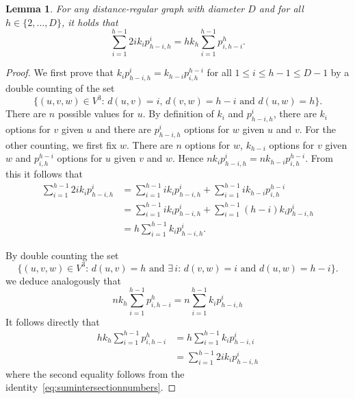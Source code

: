 \documentclass[a4paper,11pt]{article}
\newtheorem{lemma}[theorem]{Lemma}
\theoremstyle{definition}
\begin{document}
\begin{lemma}\label{lem:drgfactori}
    For any distance-regular graph with diameter $D$ and for all $h\in\{2,\dots,D\}$, it holds that $$\sum_{i = 1}^{h-1} 2ik_ip_{h-i,h}^i = hk_h\sum_{i = 1}^{h-1} p_{i,h-i}^h.$$
 
\end{lemma}

\begin{proof}
    We first prove that $k_ip_{h-i,h}^i = k_{h-i}p_{i,h}^{h-i}$ for all $1 \leq i \leq h-1 \leq D-1$ by a double counting of the set $$\{(u,v,w) \in V^3\colon\, d(u,v) = i,\, d(v,w) = h-i \text{ and } d(u,w) = h\}.$$ There are $n$ possible values for $u$. By definition of $k_i$ and $p_{h-i,h}^i$, there are $k_i$ options for $v$ given $u$ and there are $p_{h-i,h}^i$ options for $w$ given $u$ and $v$. For the other counting, we first fix $w$. There are $n$ options for $w$, $k_{h-i}$ options for $v$ given $w$ and $p_{i,h}^{h-i}$ options for $u$ given $v$ and $w$. Hence $nk_ip_{h-i,h}^i = nk_{h-i}p_{i,h}^{h-i}$. From this it follows that
    \begin{equation}\label{eq:sumintersectionnumbers}
    \begin{aligned}
        \sum_{i = 1}^{h-1} 2ik_ip_{h-i,h}^i &= \sum_{i = 1}^{h-1} ik_ip_{h-i,h}^i + \sum_{i = 1}^{h-1} ik_{h-i}p_{i,h}^{h-i}\\ 
        &= \sum_{i = 1}^{h-1} ik_ip_{h-i,h}^i + \sum_{i = 1}^{h-1} (h-i)k_ip_{h-i,h}^{i}\\
        &= h\sum_{i = 1}^{h-1} k_ip_{h-i,h}^i. 
    \end{aligned}            
    \end{equation}

    By double counting the set 
    $$\{(u,v,w) \in V^3\colon\, d(u,v) = h\text{ and } \exists\, i \colon\, d(v,w) = i\text{ and } d(u,w) = h-i\}.$$ we deduce analogously that 
    \begin{equation*}
        nk_h\sum_{i = 1}^{h-1} p_{i,h-i}^h = n\sum_{i = 1}^{h-1} k_ip_{h-i,h}^i
    \end{equation*}
    It follows directly that
    \begin{align*}
        hk_h\sum_{i = 1}^{h-1} p_{i,h-i}^h &= h\sum_{i = 1}^{h-1} k_ip_{h-i,i}^i\\
        &= \sum_{i = 1}^{h-1} 2ik_ip_{h-i,h}^i
    \end{align*}
    where the second equality follows from the identity~\eqref{eq:sumintersectionnumbers}.
\end{proof}
\end{document}
